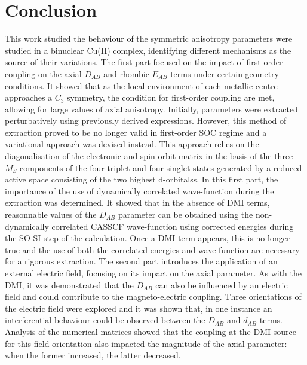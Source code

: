 \documentclass[10pt]{report}
\numberwithin{equation}{section}
\begin{document}
\newpage
\section{Conclusion}

This work studied the behaviour of the symmetric anisotropy parameters were studied in a binuclear Cu(II) complex, identifying different mechanisms as the source of their variations.
The first part focused on the impact of first-order coupling on the axial $D_{AB}$ and rhombic $E_{AB}$ terms under certain geometry conditions.
It showed that as the local environment of each metallic centre approaches a $C_3$ symmetry, the condition for first-order coupling are met, allowing for large values of axial anisotropy.
Initially,  parameters were extracted perturbatively using previously derived expressions. 
However, this method of extraction proved to be no longer valid in first-order SOC regime and a variational approach was devised instead.
This approach relies on the diagonalisation of the electronic and spin-orbit matrix in the basis of the three $M_S$ components of the four triplet and four singlet states generated by a reduced active space consisting of the two highest d-orbitalss.
In this first part, the importance of the use of dynamically correlated wave-function during the extraction was determined.
It showed that in the absence of DMI terms, reasonnable values of the $D_{AB}$ parameter can be obtained using the non-dynamically correlated CASSCF wave-function using corrected energies during the SO-SI step of the calculation.
Once a DMI term appears, this is no longer true and the use of both the correlated energies and wave-function are necessary for a rigorous extraction.
The second part introduces the application of an external electric field, focusing on its impact on the axial parameter.
As with the DMI, it was demonstrated that the $D_{AB}$ can also be influenced by an electric field and could contribute to the magneto-electric coupling.
Three orientations of the electric field were explored and it was shown that, in one instance an interferential behaviour could be observed between the $D_{AB}$ and $d_{AB}$ terms.
Analysis of the numerical matrices showed that the coupling at the DMI source for this field orientation also impacted the magnitude of the axial parameter: when the former increased, the latter decreased.
\end{document}

